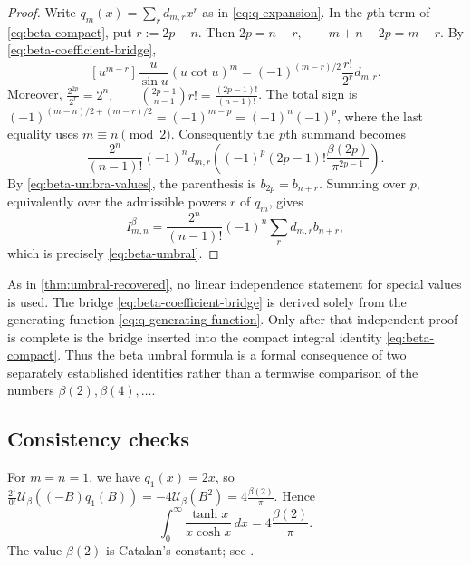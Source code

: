 \documentclass[11pt,twoside]{article}
\begin{document}

\begin{proof}
Write $q_m(x)=\sum_r d_{m,r}x^r$ as in
\eqref{eq:q-expansion}.  In the $p$th term of
\eqref{eq:beta-compact}, put
\(r:=2p-n\).
Then
\(2p=n+r, \qquad m+n-2p=m-r\).
By \eqref{eq:beta-coefficient-bridge},
\[
[u^{m-r}]\frac{u}{\sin u}(u\cot u)^m
=
(-1)^{(m-r)/2}\frac{r!}{2^r}d_{m,r}.
\]
Moreover,
\(\frac{2^{2p}}{2^r}=2^n, \qquad \binom{2p-1}{n-1}r! =\frac{(2p-1)!}{(n-1)!}\).
The total sign is
\((-1)^{(m-n)/2+(m-r)/2} =(-1)^{m-p} =(-1)^n(-1)^p\),
where the last equality uses $m\equiv n\pmod2$.  Consequently the
$p$th summand becomes
\[
\frac{2^n}{(n-1)!}
(-1)^n d_{m,r}
\left(
(-1)^p(2p-1)!\frac{\beta(2p)}{\pi^{2p-1}}
\right).
\]
By \eqref{eq:beta-umbra-values}, the parenthesis is $b_{2p}=b_{n+r}$.
Summing over $p$, equivalently over the admissible powers $r$ of
$q_m$, gives
\[
I_{m,n}^{\beta}
=\frac{2^n}{(n-1)!}(-1)^n
\sum_r d_{m,r}b_{n+r},
\]
which is precisely \eqref{eq:beta-umbral}.
\end{proof}

\begin{remark}
As in \cref{thm:umbral-recovered}, no linear independence statement for
special values is used.  The bridge
\eqref{eq:beta-coefficient-bridge} is derived solely from the generating
function \eqref{eq:q-generating-function}.  Only after that independent
proof is complete is the bridge inserted into the compact integral
identity \eqref{eq:beta-compact}.  Thus the beta umbral formula is a
formal consequence of two separately established identities rather
than a termwise comparison of the numbers
$\beta(2),\beta(4),\ldots$.
\end{remark}

\subsection{Consistency checks}

For $m=n=1$, we have $q_1(x)=2x$, so \(\frac{2^1}{0!}\mathcal U_\beta\!\left((-B)q_1(B)\right)=-4\mathcal U_\beta(B^2)=4\frac{\beta(2)}{\pi}\).
Hence
\begin{equation}
\label{eq:beta-check-11}
\boxed{
\int_0^\infty\frac{\tanh x}{x\cosh x}\,dx
=4\frac{\beta(2)}{\pi}.
}
\end{equation}
The value $\beta(2)$ is Catalan's constant; see
\cite{WeissteinBeta,Zudilin2019}.
\end{document}
